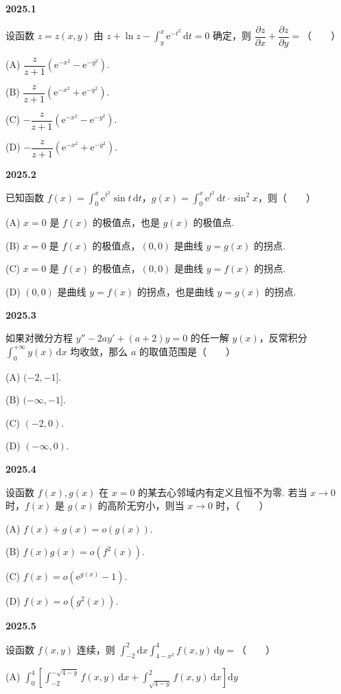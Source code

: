 \documentclass[UTF8,12pt,fontset=windows]{ctexart}
\begin{document}
{\large\bfseries 2025.1}

设函数 $z=z(x,y)$ 由 $z+\ln z-\int_y^x\mathrm{e}^{-t^2}\,\mathrm{d}t=0$ 确定，则 $\dfrac{\partial z}{\partial x}+\dfrac{\partial z}{\partial y}=$（　　）

(A) $\dfrac{z}{z+1}(\mathrm{e}^{-x^2}-\mathrm{e}^{-y^2})$.

(B) $\dfrac{z}{z+1}(\mathrm{e}^{-x^2}+\mathrm{e}^{-y^2})$.

(C) $-\dfrac{z}{z+1}(\mathrm{e}^{-x^2}-\mathrm{e}^{-y^2})$.

(D) $-\dfrac{z}{z+1}(\mathrm{e}^{-x^2}+\mathrm{e}^{-y^2})$.

\vfill
\newpage
{\large\bfseries 2025.2}

已知函数 $f(x)=\int_0^x\mathrm{e}^{t^2}\sin t\,\mathrm{d}t$，$g(x)=\int_0^x\mathrm{e}^{t^2}\,\mathrm{d}t\cdot\sin^2 x$，则（　　）

(A) $x=0$ 是 $f(x)$ 的极值点，也是 $g(x)$ 的极值点.

(B) $x=0$ 是 $f(x)$ 的极值点，$(0,0)$ 是曲线 $y=g(x)$ 的拐点.

(C) $x=0$ 是 $f(x)$ 的极值点，$(0,0)$ 是曲线 $y=f(x)$ 的拐点.

(D) $(0,0)$ 是曲线 $y=f(x)$ 的拐点，也是曲线 $y=g(x)$ 的拐点.

\vfill
\newpage
{\large\bfseries 2025.3}

如果对微分方程 $y''-2ay'+(a+2)y=0$ 的任一解 $y(x)$，反常积分 $\int_0^{+\infty}y(x)\,\mathrm{d}x$ 均收敛，那么 $a$ 的取值范围是（　　）

(A) $(-2,-1]$.

(B) $(-\infty,-1]$.

(C) $(-2,0)$.

(D) $(-\infty,0)$.

\vfill
\newpage
{\large\bfseries 2025.4}

设函数 $f(x),g(x)$ 在 $x=0$ 的某去心邻域内有定义且恒不为零. 若当 $x\to0$ 时，$f(x)$ 是 $g(x)$ 的高阶无穷小，则当 $x\to0$ 时，（　　）

(A) $f(x)+g(x)=o(g(x))$.

(B) $f(x)g(x)=o(f^2(x))$.

(C) $f(x)=o(\mathrm{e}^{g(x)}-1)$.

(D) $f(x)=o(g^2(x))$.

\vfill
\newpage
{\large\bfseries 2025.5}

设函数 $f(x,y)$ 连续，则 $\int_{-2}^{2}\mathrm{d}x\int_{4-x^2}^{4} f(x,y)\,\mathrm{d}y=$（　　）

(A) $\int_0^4\left[\int_{-2}^{-\sqrt{4-y}}f(x,y)\,\mathrm{d}x+\int_{\sqrt{4-y}}^2f(x,y)\,\mathrm{d}x\right]\mathrm{d}y$
\end{document}
